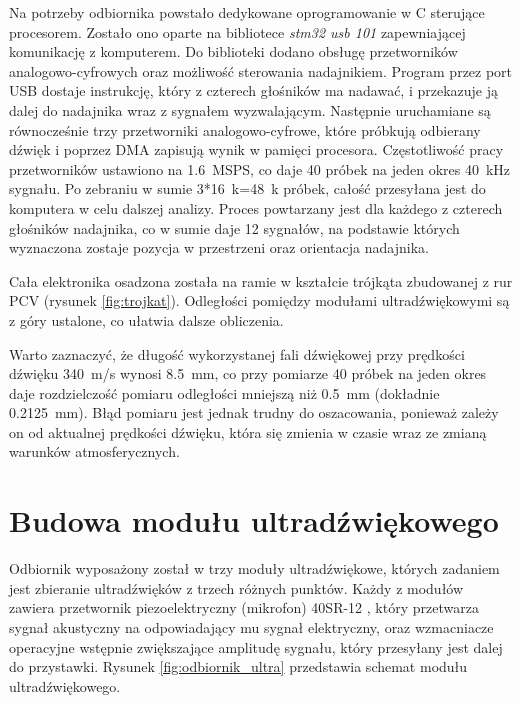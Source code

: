Na potrzeby odbiornika powstało dedykowane oprogramowanie w C sterujące procesorem.
Zostało ono oparte na bibliotece \textit{stm32 usb 101} \cite{bib:stm32_usb_101} zapewniającej komunikację z komputerem. 
Do biblioteki dodano obsługę przetworników analogowo-cyfrowych oraz możliwość sterowania nadajnikiem.
Program przez port USB dostaje instrukcję, który z czterech głośników ma nadawać, i przekazuje ją
dalej do nadajnika wraz z sygnałem wyzwalającym. Następnie uruchamiane są równocześnie trzy przetworniki analogowo-cyfrowe, które 
próbkują odbierany dźwięk i poprzez DMA zapisują wynik w pamięci procesora.
Częstotliwość pracy przetworników ustawiono na \SI{1,6}{MSPS}, co daje 40 próbek na jeden okres \SI{40}{kHz} sygnału.
Po zebraniu w sumie 3*\SI{16}{k}=\SI{48}{k} próbek, całość przesyłana jest do komputera w celu dalszej analizy.
Proces powtarzany jest dla każdego z czterech głośników nadajnika, 
co w sumie daje 12 sygnałów, na podstawie których wyznaczona zostaje 
pozycja w przestrzeni oraz orientacja nadajnika.

Cała elektronika osadzona została na ramie w kształcie trójkąta zbudowanej z rur PCV  (rysunek \ref{fig:trojkat}). 
Odległości pomiędzy modułami ultradźwiękowymi są z góry ustalone, co ułatwia dalsze obliczenia.

Warto zaznaczyć, że długość wykorzystanej fali dźwiękowej przy prędkości dźwięku \SI{340}{m/s} wynosi \SI{8.5}{mm}, co przy 
pomiarze 40 próbek na jeden okres daje rozdzielczość pomiaru odległości mniejszą niż \SI{0.5}{mm} (dokładnie \SI{0.2125}{mm}).
Błąd pomiaru jest jednak trudny do oszacowania, ponieważ  zależy on od aktualnej prędkości
dźwięku, która się zmienia w czasie wraz ze zmianą warunków atmosferycznych.



\section{Budowa modułu ultradźwiękowego}

Odbiornik wyposażony został w trzy moduły ultradźwiękowe, których zadaniem jest 
zbieranie ultradźwięków z trzech różnych  punktów.
Każdy z modułów zawiera przetwornik piezoelektryczny (mikrofon) 40SR-12 \cite{bib:40ST12},
który przetwarza sygnał akustyczny na odpowiadający mu sygnał elektryczny, oraz wzmacniacze operacyjne 
wstępnie zwiększające amplitudę sygnału, który przesyłany jest dalej do przystawki.
Rysunek \ref{fig:odbiornik_ultra} przedstawia schemat modułu ultradźwiękowego.

